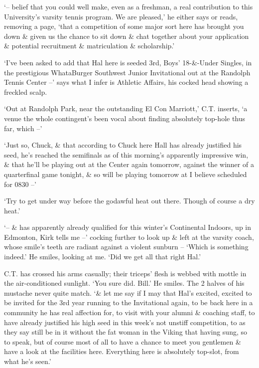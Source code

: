 \documentclass{article}
\numberwithin{equation}{section}
\begin{document}
`-- belief that you could well make, even as a freshman, a real contribution to this University's varsity tennis program. We are pleased,' he either says or reads, removing a page, `that a competition of some major sort here has brought you down \& given us the chance to sit down \& chat together about your application \& potential recruitment \& matriculation \& scholarship.'

`I've been asked to add that Hal here is seeded 3rd, Boys' 18-\&-Under Singles, in the prestigious WhataBurger Southwest Junior Invitational out at the Randolph Tennis Center --' says what I infer is Athletic Affairs, his cocked head showing a freckled scalp.

`Out at Randolph Park, near the outstanding El Con Marriott,' C.T. inserts, `a venue the whole contingent's been vocal about finding absolutely top-hole thus far, which --'

`Just so, Chuck, \& that according to Chuck here Hall has already justified his seed, he's reached the semifinals as of this morning's apparently impressive win, \& that he'll be playing out at the Center again tomorrow, against the winner of a quarterfinal game tonight, \& so will be playing tomorrow at I believe scheduled for 0830 --'

`Try to get under way before the godawful heat out there. Though of course a dry heat.'

`-- \& has apparently already qualified for this winter's Continental Indoors, up in Edmonton, Kirk tells me --' cocking further to look up \& left at the varsity coach, whose smile's teeth are radiant against a violent sunburn -- `Which is something indeed.' He smiles, looking at me. `Did we get all that right Hal.'

C.T. has crossed his arms casually; their triceps' flesh is webbed with mottle in the air-conditioned sunlight. `You sure did. Bill.' He smiles. The 2 halves of his mustache never quite match. `\& let me say if I may that Hal's excited, excited to be invited for the 3rd year running to the Invitational again, to be back here in a community he has real affection for, to visit with your alumni \& coaching staff, to have already justified his high seed in this week's not unstiff competition, to as they say still be in it without the fat woman in the Viking that having sung, so to speak, but of course most of all to have a chance to meet you gentlemen \& have a look at the facilities here. Everything here is absolutely top-slot, from what he's seen.'
\end{document}
